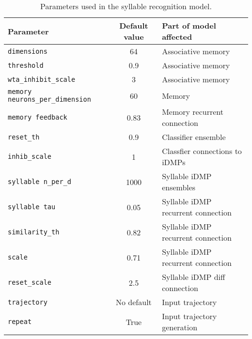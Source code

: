 \begin{table}[ht!]
  \begin{footnotesize}
    \begin{center}
      \begin{tabular}{lcl}
        \toprule
        Parameter & Default value & Part of model affected \\
        \midrule
        \texttt{dimensions} & 64 & Associative memory \\
        \texttt{threshold} & 0.9 & Associative memory \\
        \texttt{wta\_inhibit\_scale} & 3 & Associative memory \\
        \texttt{memory neurons\_per\_dimension} & 60 & Memory \\
        \texttt{memory feedback} & 0.83 & Memory recurrent connection \\
        \texttt{reset\_th} & 0.9 & Classifier ensemble \\
        \texttt{inhib\_scale} & 1 & Classfier connections to iDMPs \\
        \texttt{syllable n\_per\_d} & 1000 & Syllable iDMP ensembles \\
        \texttt{syllable tau} & 0.05 & Syllable iDMP recurrent connection \\
        \texttt{similarity\_th} & 0.82 & Syllable iDMP recurrent connection \\
        \texttt{scale} & 0.71 & Syllable iDMP recurrent connection \\
        \texttt{reset\_scale} & 2.5 & Syllable iDMP diff connection \\
        \texttt{trajectory} & No default & Input trajectory \\
        \texttt{repeat} & True & Input trajectory generation \\
        \bottomrule
      \end{tabular}
    \end{center}
  \end{footnotesize}
  \caption{Parameters used in the syllable recognition model.}
\label{tab:recog}
\end{table}


